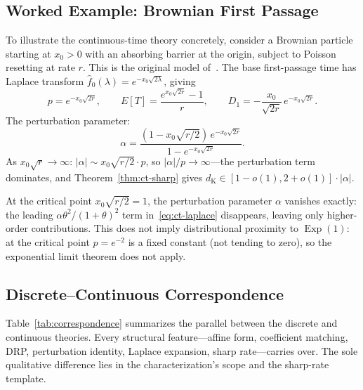 \documentclass[11pt]{article}
\theoremstyle{plain}
\theoremstyle{definition}
\theoremstyle{remark}
\DeclareMathOperator{\Var}{Var}
\DeclareMathOperator{\Exp}{Exp}
\newcommand{\dK}{d_{\mathrm{K}}}
\begin{document}

\subsection{Worked Example: Brownian First Passage}\label{sec:brownian}

To illustrate the continuous-time theory concretely, consider a Brownian particle starting at $x_0 > 0$ with an absorbing barrier at the origin, subject to Poisson resetting at rate $r$.  This is the original model of~\cite{EM11}.  The base first-passage time has Laplace transform $\hat{f}_0(\lambda) = e^{-x_0\sqrt{2\lambda}}$, giving
\[
  p = e^{-x_0\sqrt{2r}}, \qquad
  E[T] = \frac{e^{x_0\sqrt{2r}} - 1}{r}, \qquad
  D_1 = -\frac{x_0}{\sqrt{2r}}\,e^{-x_0\sqrt{2r}}.
\]
The perturbation parameter:
\begin{equation}\label{eq:brownian-alpha}
  \alpha = \frac{(1 - x_0\sqrt{r/2})\,e^{-x_0\sqrt{2r}}}{1 - e^{-x_0\sqrt{2r}}}.
\end{equation}
As $x_0\sqrt{r} \to \infty$: $|\alpha| \sim x_0\sqrt{r/2}\cdot p$, so $|\alpha|/p \to \infty$---the perturbation term dominates, and Theorem~\ref{thm:ct-sharp} gives $\dK \in [1-o(1), 2+o(1)] \cdot |\alpha|$.  %

At the critical point $x_0\sqrt{r/2} = 1$, the perturbation parameter $\alpha$ vanishes exactly: the leading $\alpha\theta^2/(1+\theta)^2$ term in~\eqref{eq:ct-laplace} disappears, leaving only higher-order contributions.  This does not imply distributional proximity to $\Exp(1)$: at the critical point $p = e^{-2}$ is a fixed constant (not tending to zero), so the exponential limit theorem does not apply.


\subsection{Discrete--Continuous Correspondence}\label{sec:correspondence}

Table~\ref{tab:correspondence} summarizes the parallel between the discrete and continuous theories.  Every structural feature---affine form, coefficient matching, DRP, perturbation identity, Laplace expansion, sharp rate---carries over.  The sole qualitative difference lies in the characterization's scope and the sharp-rate template.
\end{document}

